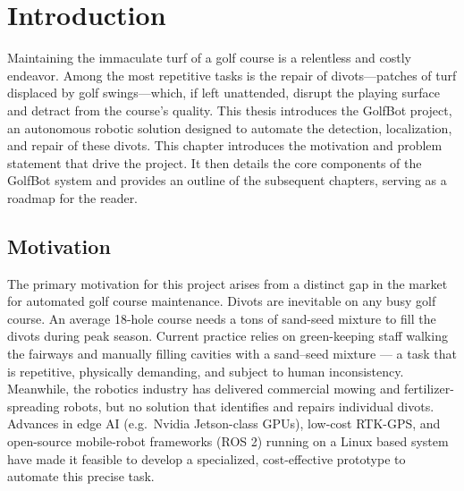 \chapter{Introduction}
\label{chap:introduction}
Maintaining the immaculate turf of a golf course is a relentless and costly endeavor. Among the most repetitive tasks is the repair of divots—patches of turf displaced by golf swings—which, if left unattended, disrupt the playing surface and detract from the course's quality. This thesis introduces the GolfBot project, an autonomous robotic solution designed to automate the detection, localization, and repair of these divots. This chapter introduces the motivation and problem statement that drive the project. It then details the core components of the GolfBot system and provides an outline of the subsequent chapters, serving as a roadmap for the reader.


\section{Motivation}
\label{sec:motivation}
The primary motivation for this project arises from a distinct gap in the market for automated golf course maintenance. 
Divots are inevitable on any busy golf course.  An average 18-hole course needs a tons of sand-seed mixture to fill the divots during peak season. Current practice relies on green-keeping staff walking the fairways and manually filling cavities with a sand–seed mixture — a task that is repetitive, physically demanding, and subject to human inconsistency.  Meanwhile, the robotics industry has delivered commercial mowing and fertilizer-spreading robots, but no solution that identifies and repairs individual divots.  
Advances in edge AI (e.g.\ Nvidia Jetson-class GPUs), low-cost RTK-GPS, and open-source mobile-robot frameworks (ROS 2) running on a Linux based system have made it feasible to develop a specialized, cost-effective prototype to automate this precise task.  


